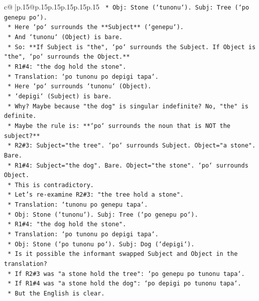 \documentclass{article}
\begin{document}
{\begin{supertabular}{c@{$\;$}|p{.15\linewidth}@{}p{.15\linewidth}p{.15\linewidth}p{.15\linewidth}p{.15\linewidth}p{.15\linewidth}}
{{{\texttt{        *   Obj: Stone (`tunonu`). Subj: Tree (`po genepu po`).} \\
\texttt{        *   Here `po` surrounds the **Subject** (`genepu`).} \\
\texttt{        *   And `tunonu` (Object) is bare.} \\
\texttt{        *   So: **If Subject is "the", `po` surrounds the Subject. If Object is "the", `po` surrounds the Object.**} \\
\texttt{        *   R1\#4: "the dog hold the stone".} \\
\texttt{        *   Translation: `po tunonu po depigi tapa`.} \\
\texttt{        *   Here `po` surrounds `tunonu` (Object).} \\
\texttt{        *   `depigi` (Subject) is bare.} \\
\texttt{        *   Why? Maybe because "the dog" is singular indefinite? No, "the" is definite.} \\
\texttt{        *   Maybe the rule is: **`po` surrounds the noun that is NOT the subject?**} \\
\texttt{        *   R2\#3: Subject="the tree". `po` surrounds Subject. Object="a stone". Bare.} \\
\texttt{        *   R1\#4: Subject="the dog". Bare. Object="the stone". `po` surrounds Object.} \\
\texttt{        *   This is contradictory.} \\
\texttt{        *   Let's re{-}examine R2\#3: "the tree hold a stone".} \\
\texttt{        *   Translation: `tunonu po genepu tapa`.} \\
\texttt{        *   Obj: Stone (`tunonu`). Subj: Tree (`po genepu po`).} \\
\texttt{        *   R1\#4: "the dog hold the stone".} \\
\texttt{        *   Translation: `po tunonu po depigi tapa`.} \\
\texttt{        *   Obj: Stone (`po tunonu po`). Subj: Dog (`depigi`).} \\
\texttt{        *   Is it possible the informant swapped Subject and Object in the translation?} \\
\texttt{        *   If R2\#3 was "a stone hold the tree": `po genepu po tunonu tapa`.} \\
\texttt{        *   If R1\#4 was "a stone hold the dog": `po depigi po tunonu tapa`.} \\
\texttt{        *   But the English is clear.} \\
}}}
\end{supertabular}}
\end{document}
